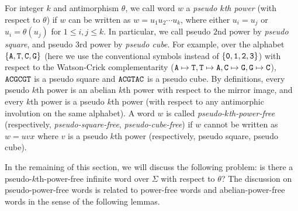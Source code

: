 \documentclass[12pt]{article}
\def\mtt#1{{\tt #1}}
\begin{document}
For integer $k$ and antimorphism $\theta$, we call word $w$ a
\emph{pseudo $k$th power} (with respect to $\theta$) if $w$ can be
written as $w=u_1u_2\cdots u_k$, where either $u_i=u_j$ or
$u_i=\theta(u_j)$ for $1\leq i,j\leq k$. In particular, we call
pseudo $2$nd power by \emph{pseudo square}, and pseudo $3$rd power
by \emph{pseudo cube}. For example, over the alphabet $\{\mtt A,
\mtt T, \mtt C, \mtt G\}$ (here we use the conventional symbols
instead of $\{\mtt0,\mtt1,\mtt2,\mtt3\}$) with respect to the
Watson-Crick complementarity ($\mtt A\mapsto\mtt T, \mtt
T\mapsto\mtt A, \mtt C\mapsto\mtt G, \mtt G\mapsto\mtt C$), $\mtt
A\mtt C\mtt G\mtt C\mtt G\mtt T$ is a pseudo square and $\mtt A\mtt
C\mtt G\mtt T\mtt A\mtt C$ is a pseudo cube. By definitions, every
pseudo $k$th power is an abelian $k$th power with respect to the
mirror image, and every $k$th power is a pseudo $k$th power (with
respect to any antimorphic involution on the same alphabet). A word
$w$ is called \emph{pseudo-$k$th-power-free} (respectively,
\emph{pseudo-square-free}, \emph{pseudo-cube-free}) if $w$ cannot be
written as $w=uvx$ where $v$ is a pseudo $k$th power (respectively,
pseudo square, pseudo cube).


In the remaining of this section, we will discuss the following
problem: is there a pseudo-$k$th-power-free infinite word over
$\Sigma$ with respect to $\theta$? The discussion on
pseudo-power-free words is related to power-free words and
abelian-power-free words in the sense of the following lemmas.
\end{document}
